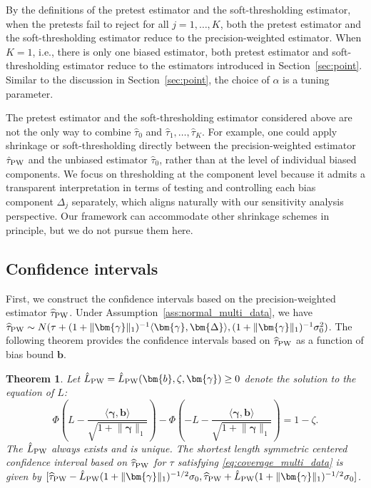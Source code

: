 \documentclass[11pt]{article}
\newcommand{\htau}{\widehat\tau}
\numberwithin{equation}{section}
\newtheorem{theorem}{Theorem}[section]
\theoremstyle{definition}
\begin{document}
By the definitions of the pretest estimator and the soft-thresholding estimator, when the pretests fail to reject for all $j=1,\ldots,K$, both the pretest estimator and the soft-thresholding estimator reduce to the precision-weighted estimator. When $K=1$, i.e., there is only one biased estimator, both pretest estimator and soft-thresholding estimator reduce to the estimators introduced in Section~\ref{sec:point}. Similar to the discussion in Section~\ref{sec:point}, the choice of $\alpha$ is a tuning parameter.

The pretest estimator and the soft-thresholding estimator considered above are not the only way to combine $\hat\tau_0$ and $\hat\tau_1,\ldots,\hat\tau_K$. For example, one could apply shrinkage or soft-thresholding directly between the precision-weighted estimator $\hat\tau_{\rm PW}$ and the unbiased estimator $\hat\tau_0$, rather than at the level of individual biased components. We focus on thresholding at the component level because it admits a transparent interpretation in terms of testing and controlling each bias component $\Delta_j$ separately, which aligns naturally with our sensitivity analysis perspective. Our framework can accommodate other shrinkage schemes in principle, but we do not pursue them here.

\subsection{Confidence intervals}

First, we construct the confidence intervals based on the precision-weighted estimator $\htau_{\rm PW}$. Under Assumption~\ref{ass:normal_multi_data}, we have $\htau_{\rm PW} \sim N(\tau + (1+\lVert \bm{\gamma} \rVert_1)^{-1} \langle \bm{\gamma}, \bm{\Delta} \rangle, (1+\lVert \bm{\gamma} \rVert_1)^{-1} \sigma_0^2)$. The following theorem provides the confidence intervals based on $\htau_{\rm PW}$ as a function of bias bound $\bm{b}$.



\begin{theorem}\label{prop:L_PW_multi}
  Let $\hat{L}_{\rm PW} = \hat{L}_{\rm PW}(\bm{b}, \zeta, \bm{\gamma}) \ge 0$ denote the solution to the equation of $L$:
  \[
    \Phi\left(L - \frac{\langle \bm{\gamma}, \bm{b} \rangle}{\sqrt{1+\lVert \bm{\gamma} \rVert_1}}  \right) - \Phi\left(-L - \frac{\langle \bm{\gamma}, \bm{b} \rangle}{\sqrt{1+\lVert \bm{\gamma} \rVert_1}} \right) = 1-\zeta.
  \]
  The $\hat{L}_{\rm PW}$ always exists and is unique. The shortest length symmetric centered confidence interval based on $\htau_{\rm PW}$ for $\tau$ satisfying \eqref{eq:coverage_multi_data} is given by $[\htau_{\rm PW} - \hat{L}_{\rm PW} (1+\lVert \bm{\gamma} \rVert_1)^{-1/2} \sigma_0, \htau_{\rm PW} + \hat{L}_{\rm PW} (1+\lVert \bm{\gamma} \rVert_1)^{-1/2} \sigma_0]$.
\end{theorem}
\end{document}
